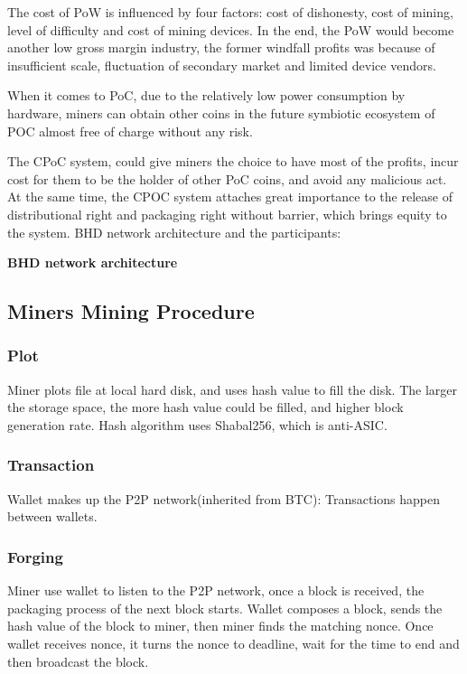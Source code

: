 \begin{flushleft}
    The cost of PoW is influenced by four factors: cost of dishonesty, cost of mining, level of difficulty and cost of mining devices. In the end, the PoW would become another low gross margin industry, the former windfall profits was because of insufficient scale, fluctuation of secondary market and limited device vendors.
\end{flushleft}
\begin{flushleft}
    When it comes to PoC, due to the relatively low power consumption by hardware, miners can obtain other coins in the future symbiotic ecosystem of POC almost free of charge without any risk.
\end{flushleft}
\begin{flushleft}
    The CPoC system, could give miners the choice to have most of the profits, incur cost for them to be the holder of other PoC coins, and avoid any malicious act. At the same time, the CPOC system attaches great importance to the release of distributional right and packaging right without barrier, which brings equity to the system. BHD network architecture and the participants:
\end{flushleft}
\begin{flushleft}
    \centering\textbf{BHD network architecture}
\end{flushleft}

\subsection{Miners Mining Procedure}
\subsubsection{Plot}
\begin{flushleft}
    Miner plots file at local hard disk, and uses hash value to fill the disk. The larger the storage space, the more hash value could be filled, and higher block generation rate. Hash algorithm uses Shabal256, which is anti-ASIC.
\end{flushleft}
\subsubsection{Transaction}
\begin{flushleft}
    Wallet makes up the P2P network(inherited from BTC): Transactions happen between wallets.
\end{flushleft}
\subsubsection{Forging}
\begin{flushleft}
    Miner use wallet to listen to the P2P network, once a block is received, the packaging process of the next block starts. Wallet composes a block, sends the hash value of the block to miner, then miner finds the matching nonce. Once wallet receives nonce, it turns the nonce to deadline, wait for the time to end and then broadcast the block.
\end{flushleft}
